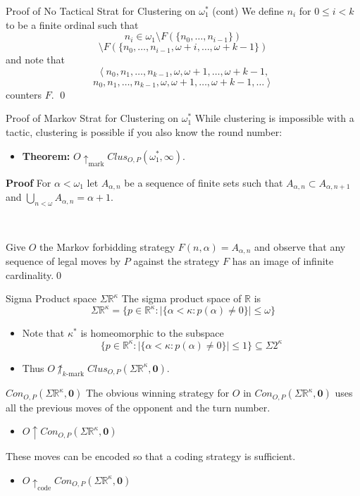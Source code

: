 \documentclass{beamer}
\newcommand{\win}{\uparrow}
\newcommand{\markwin}{\uparrow_{\text{mark}}}
\newcommand{\kmarkwin}[1]{\uparrow_{#1\text{-mark}}}
\newcommand{\codewin}{\uparrow_{\text{code}}}
\newcommand{\oneptcomp}[1]{#1^*}
\newcommand{\congame}[2]{Con_{O,P}(#1,#2)}
\newcommand{\clusgame}[2]{Clus_{O,P}(#1,#2)}
\newcommand{\sigmaprodr}[1]{\Sigma\mathbb{R}^{#1}}
\newcommand{\sigmaprodtwo}[1]{\Sigma2^{#1}}
\renewcommand{\vec}[1]{\mathbf{#1}}
\begin{document}
\begin{frame}{Proof of No Tactical Strat for Clustering on $\oneptcomp{\omega_1}$ (cont)}
We define $n_i$ for $0\leq i < k$ to be a finite ordinal such that
\[
n_i \in \omega_1 \setminus F(\{n_0,\dots,n_{i-1}\})
\]
\[
\setminus F(\{n_0,\dots,n_{i-1},\omega+i,\dots,\omega+k-1\})
\]
\pause
and note that
\[
\left<n_0,n_1,\dots,n_{k-1},\omega,\omega+1,\dots,\omega+k-1,\right.
\]
\[
\left.n_0,n_1,\dots,n_{k-1},\omega,\omega+1,\dots,\omega+k-1,\dots\right>
\]
counters $F$. \qed
\end{frame}

\begin{frame}{Proof of Markov Strat for Clustering on $\oneptcomp{\omega_1}$}
While clustering is impossible with a tactic, clustering is possible if you also know the round number:
\begin{itemize}
\item \textbf{Theorem:} $O\markwin \clusgame{\oneptcomp{\omega_1}}{\infty}$.
\end{itemize}
\pause
\textbf{Proof} For $\alpha<\omega_1$ let $A_{\alpha,n}$ be a sequence of finite sets such that $A_{\alpha,n}\subset A_{\alpha,n+1}$ and $\bigcup_{n<\omega}A_{\alpha,n}=\alpha+1$.

\pause\,

Give $O$ the Markov forbidding strategy $F(n,\alpha)=A_{\alpha,n}$ and observe that any sequence of legal moves by $P$ against the strategy $F$ has an image of infinite cardinality.\qed
\end{frame}

\begin{frame}{Sigma Product space $\sigmaprodr{\kappa}$}
The sigma product space of $\mathbb{R}$ is \[\sigmaprodr{\kappa}=\{p\in\mathbb{R}^\kappa:|\{\alpha<\kappa:p(\alpha)\not=0\}|\leq\omega\}\]
\pause
\begin{itemize}
\item Note that $\oneptcomp{\kappa}$ is homeomorphic to the subspace \[\{p\in\mathbb{R}^\kappa:|\{\alpha<\kappa:p(\alpha)\not=0\}|\leq 1\}\subseteq\sigmaprodtwo{\kappa}\]
\pause
\item Thus $O\not\kmarkwin{k}\clusgame{\sigmaprodr{\kappa}}{\vec{0}}$.
\end{itemize}
\end{frame}

\begin{frame}{$\congame{\sigmaprodr{\kappa}}{\vec{0}}$}
The obvious winning strategy for $O$ in $\congame{\sigmaprodr{\kappa}}{\vec{0}}$ uses all the previous moves of the opponent and the turn number.
\begin{itemize}
\item $O\win\congame{\sigmaprodr{\kappa}}{\vec{0}}$
\end{itemize}
\pause
These moves can be encoded so that a coding strategy is sufficient.
\begin{itemize}
\item $O\codewin\congame{\sigmaprodr{\kappa}}{\vec{0}}$
\end{itemize}
\end{frame}
\end{document}

